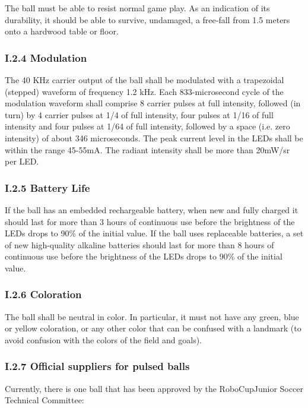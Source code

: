 \documentclass{article}
\begin{document}
The ball must be able to resist normal game play. As an indication of its durability, it should be able to survive, undamaged, a free-fall from 1.5 meters onto a hardwood table or floor.

\subsubsection{I.2.4 Modulation}

The 40 KHz carrier output of the ball shall be modulated with a trapezoidal (stepped) waveform of frequency 1.2 kHz. Each 833-microsecond cycle of the modulation waveform shall comprise 8 carrier pulses at full intensity, followed (in turn) by 4 carrier pulses at 1/4 of full intensity, four pulses at 1/16 of full intensity and four pulses at 1/64 of full intensity, followed by a space (i.e. zero intensity) of about 346 microseconds. The peak current level in the LEDs shall be within the range 45-55mA. The radiant intensity shall be more than 20mW/sr per LED.

\subsubsection{I.2.5 Battery Life}

If the ball has an embedded rechargeable battery, when new and fully charged it should last for more than 3 hours of continuous use before the brightness of the LEDs drops to 90\% of the initial value. If the ball uses replaceable batteries, a set of new high-quality alkaline batteries should last for more than 8 hours of continuous use before the brightness of the LEDs drops to 90\% of the initial value.

\subsubsection{I.2.6 Coloration}

The ball shall be neutral in color. In particular, it must not have any green, blue or yellow coloration, or any other color that can be confused with a landmark (to avoid confusion with the colors of the field and goals).

\subsubsection{I.2.7 Official suppliers for pulsed balls}

Currently, there is one ball that has been approved by the RoboCupJunior Soccer Technical Committee:
\end{document}
